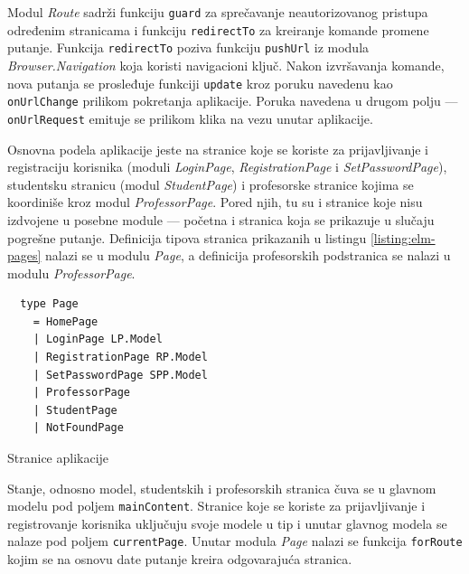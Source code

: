 \documentclass[12pt,oneside]{memoir}
\begin{document}
Modul \emph{Route} sadrži funkciju \texttt{guard} za sprečavanje
neautorizovanog pristupa određenim stranicama i funkciju \texttt{redirectTo} za kreiranje
komande promene putanje. Funkcija \texttt{redirectTo} poziva funkciju \texttt{pushUrl} iz modula
\emph{Browser.Navigation} koja koristi navigacioni ključ. Nakon izvršavanja komande,
nova putanja se prosleđuje funkciji \texttt{update} kroz poruku navedenu kao \texttt{onUrlChange} prilikom
pokretanja aplikacije. Poruka navedena u drugom polju --- \texttt{onUrlRequest} emituje se prilikom klika na
vezu unutar aplikacije. 

Osnovna podela aplikacije jeste na stranice koje se koriste za prijavljivanje i registraciju korisnika
(moduli \emph{LoginPage}, \emph{RegistrationPage} i \emph{SetPasswordPage}), studentsku stranicu (modul \emph{StudentPage})
i profesorske stranice kojima se koordiniše kroz modul \emph{ProfessorPage}. Pored njih, tu su i stranice koje nisu izdvojene u
posebne module --- početna i stranica koja se prikazuje u slučaju pogrešne putanje. Definicija tipova stranica prikazanih u
listingu \ref{listing:elm-pages} nalazi se u modulu \emph{Page}, a definicija profesorskih podstranica se nalazi u modulu \emph{ProfessorPage}.
\begin{listing}[h]
\begin{verbatim}
  type Page
    = HomePage
    | LoginPage LP.Model
    | RegistrationPage RP.Model
    | SetPasswordPage SPP.Model
    | ProfessorPage
    | StudentPage
    | NotFoundPage
\end{verbatim}
\caption{Stranice aplikacije}
\label{listing:elm-pages}
\end{listing}
Stanje, odnosno model, studentskih i profesorskih stranica čuva se u glavnom modelu pod poljem \texttt{mainContent}.
Stranice koje se koriste za prijavljivanje i registrovanje korisnika uključuju svoje modele u tip
i unutar glavnog modela se nalaze pod poljem \texttt{currentPage}. Unutar modula \emph{Page}
nalazi se funkcija \texttt{forRoute} kojim se na osnovu date putanje kreira odgovarajuća stranica.
\end{document}
